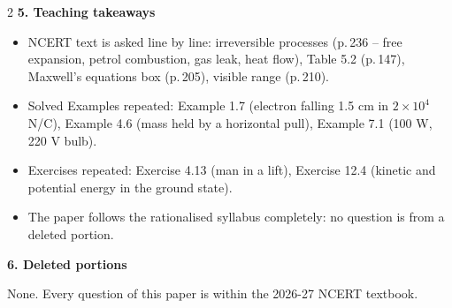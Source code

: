 \begin{multicols}{2}
\textbf{\color{crimson}5. Teaching takeaways}\par\smallskip
{\footnotesize\begin{itemize}[leftmargin=1em,nosep]
\item NCERT text is asked line by line: irreversible processes (p.\,236 -- free expansion, petrol combustion, gas leak, heat flow), Table 5.2 (p.\,147), Maxwell's equations box (p.\,205), visible range (p.\,210).
\item Solved Examples repeated: Example 1.7 (electron falling 1.5 cm in $2\times10^4$ N/C), Example 4.6 (mass held by a horizontal pull), Example 7.1 (100 W, 220 V bulb).
\item Exercises repeated: Exercise 4.13 (man in a lift), Exercise 12.4 (kinetic and potential energy in the ground state).
\item The paper follows the rationalised syllabus completely: no question is from a deleted portion.
\end{itemize}}\par\medskip
\textbf{\color{crimson}6. Deleted portions}\par\smallskip
None. Every question of this paper is within the 2026-27 NCERT textbook.\par
\end{multicols}












